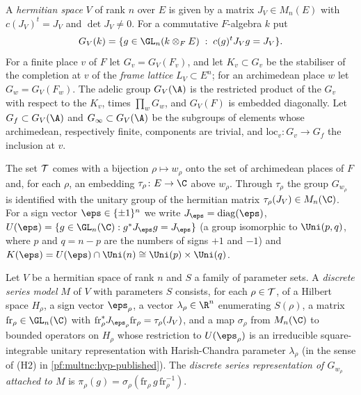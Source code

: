 \begin{definition}\label{pf:multnc:def-groups}
A \emph{hermitian space} $V$ of rank $n$ over $E$ is given by a matrix $J_V\in M_n(E)$ with $c(J_V)^{t}=J_V$ and
$\det J_V\ne0$. For a commutative $F$-algebra $k$ put
\[
G_V(k)=\{g\in\GL_n(k\otimes_FE)\;:\;c(g)^{t}J_Vg=J_V\}.
\]
For a finite place $v$ of $F$ let $G_v=G_V(F_v)$, and let $K_v\subset G_v$ be the stabiliser of the completion at $v$
of the \emph{frame lattice} $L_V\subset E^n$; for an archimedean place $w$ let $G_w=G_V(F_w)$. The adelic group
$G_V(\A)$ is the restricted product of the $G_v$ with respect to the $K_v$, times $\prod_wG_w$, and $G_V(F)$ is
embedded diagonally. Let $G_f\subset G_V(\A)$ and $G_\infty\subset G_V(\A)$ be the subgroups of elements whose
archimedean, respectively finite, components are trivial, and $\mathrm{loc}_v\colon G_v\to G_f$ the inclusion at $v$.
\end{definition}

The set $\mathcal{T}$ comes with a bijection $\rho\mapsto w_\rho$ onto the set of archimedean places of $F$ and, for each
$\rho$, an embedding $\tau_\rho\colon E\to\C$ above $w_\rho$. Through $\tau_\rho$ the group $G_{w_\rho}$ is identified
with the unitary group of the hermitian matrix $\tau_\rho(J_V)\in M_n(\C)$. For a sign vector $\eps\in\{\pm1\}^n$ we
write $J_\eps=\mathrm{diag}(\eps)$, $U(\eps)=\{g\in\GL_n(\C):g^*J_\eps g=J_\eps\}$ (a group isomorphic to $\Uni(p,q)$,
where $p$ and $q=n-p$ are the numbers of signs $+1$ and $-1$) and $K(\eps)=U(\eps)\cap\Uni(n)\cong\Uni(p)\times\Uni(q)$.

\begin{definition}\label{pf:multnc:def-dsmodel}
Let $V$ be a hermitian space of rank $n$ and $S$ a family of parameter sets. A \emph{discrete series model} $M$ of $V$
with parameters $S$ consists, for each $\rho\in\mathcal{T}$, of a Hilbert space $H_\rho$, a sign vector $\eps_\rho$, a
vector $\lambda_\rho\in\R^n$ enumerating $S(\rho)$, a matrix $\mathrm{fr}_\rho\in\GL_n(\C)$ with
$\mathrm{fr}_\rho^*J_{\eps_\rho}\mathrm{fr}_\rho=\tau_\rho(J_V)$, and a map $\sigma_\rho$ from $M_n(\C)$ to bounded
operators on $H_\rho$ whose restriction to $U(\eps_\rho)$ is an irreducible square-integrable unitary representation
with Harish-Chandra parameter $\lambda_\rho$ (in the sense of (H2) in \cref{pf:multnc:hyp-published}). The \emph{discrete
series representation of $G_{w_\rho}$ attached to $M$} is $\pi_\rho(g)=\sigma_\rho(\mathrm{fr}_\rho\,g\,\mathrm{fr}_\rho^{-1})$.
\end{definition}

